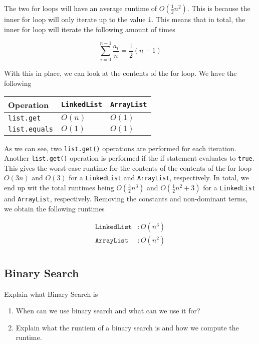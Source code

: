 \documentclass{article}
\begin{document}
    \begin{ans}
        The two for loops will have an average runtime of \( O\left( \frac{1}{2} n^2 \right) \). This is because the inner for loop will only iterate up to the value \texttt{i}. This means that in total, the inner for loop will iterate the following amount of times

        \[ \sum_{i=0}^{n - 1} \frac{a_{i}}{n} = \frac{1}{2} \left( n - 1 \right) \]

        With this in place, we can look at the contents of the for loop. We have the following

        \begin{table}[H]
            \begin{center}
                \begin{tabular}[c]{|l|l|l|}
                    \hline
                    Operation &\texttt{LinkedList}& \texttt{ArrayList} \\
                    \hline
                    \texttt{list.get} & \( O(n) \) & \( O(1) \)\\
                    \texttt{list.equals} & \( O(1) \) & \( O(1) \)\\
                    \hline
                \end{tabular}
            \end{center}
        \end{table}

        As we can see, two \texttt{list.get()} operations are performed for each iteration. Another \texttt{list.get()} operation is performed if the if statement evaluates to \texttt{true}. This gives the worst-case runtime for the contents of the contents of the for loop \( O(3n) \) and \( O(3) \) for a \texttt{LinkedList} and \texttt{ArrayList}, respectively. In total, we end up wit the total runtimes being \( O(\frac{3}{2} n^3) \) and \( O(\frac{1}{2} n^2 + 3) \) for a \texttt{LinkedList} and \texttt{ArrayList}, respectively. Removing the constants and non-dominant terms, we obtain the following runtimes

        \begin{align*}
            \texttt{LinkedList}&: O(n^3)\\
            \texttt{ArrayList}&: O(n^2)\\
        \end{align*}
    \end{ans}

    \subsection{Binary Search}
    Explain what Binary Search is
    \begin{enumerate}
        \item When can we use binary search and what can we use it for? 
        \item Explain what the runtiem of a binary search is and how we compute the runtime.
    \end{enumerate}
\end{document}
